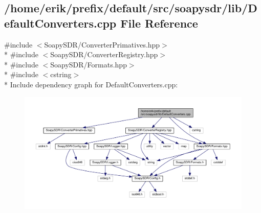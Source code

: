 \subsection{/home/erik/prefix/default/src/soapysdr/lib/\+Default\+Converters.cpp File Reference}
\label{DefaultConverters_8cpp}
{\ttfamily \#include $<$Soapy\+S\+D\+R/\+Converter\+Primatives.\+hpp$>$}\\*
{\ttfamily \#include $<$Soapy\+S\+D\+R/\+Converter\+Registry.\+hpp$>$}\\*
{\ttfamily \#include $<$Soapy\+S\+D\+R/\+Formats.\+hpp$>$}\\*
{\ttfamily \#include $<$cstring$>$}\\*
Include dependency graph for Default\+Converters.\+cpp\+:
\nopagebreak
\begin{figure}[H]
\begin{center}
\leavevmode
\includegraphics[width=350pt]{d3/db1/DefaultConverters_8cpp__incl}
\end{center}
\end{figure}
